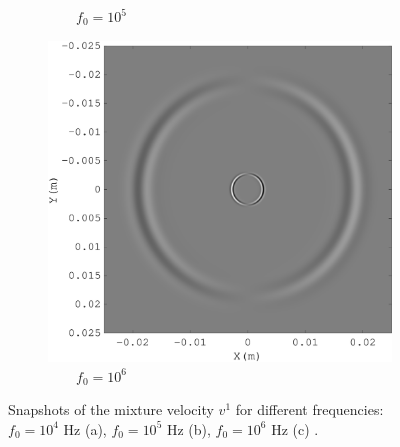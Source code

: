 \documentclass[3p,times,table]{article}
\begin{document}
\begin{figure}[!htbp]
\begin{subfigure}{0.3\linewidth}
\caption{$\quad\quad f_0=10^{5} $}
\end{subfigure}%
\hfill
\begin{subfigure}{0.3\linewidth}
\includegraphics[draft=false,width=1\textwidth]{Figures/frec_big_10_6}
\caption{$\quad\quad f_0=10^{6} $}
\end{subfigure}%
\caption{  Snapshots of the mixture velocity $v^1$ for different frequencies: 
$f_0=10^{4}$ Hz (a), $f_0=10^{5}$ Hz (b), $f_0=10^{6}$ Hz (c) .  }
\label{fig:compare_frewuency}
\end{figure}
\end{document}
